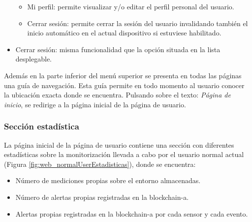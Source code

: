 \documentclass[12pt,a4paper, twoside]{report}
\begin{document}
\begin{itemize}
			\begin{itemize}
				\item Mi perfil: permite visualizar y/o editar el perfil personal del usuario.
				\item Cerrar sesión: permite cerrar la sesión del usuario invalidando también el inicio automático en el actual dispositivo si estuviese habilitado.
			\end{itemize}
			
		\item Cerrar sesión: misma funcionalidad que la opción situada en la lista desplegable.

	\end{itemize}

	Además en la parte inferior del menú superior se presenta en todas las páginas una guía de navegación. Esta guía permite en todo momento al usuario conocer la ubicación exacta donde se encuentra. Pulsando sobre el texto: \textit{Página de inicio}, se redirige a la página inicial de la página de usuario.
	
	\subsubsection{Sección estadística}
	
	La página inicial de la página de usuario contiene una sección con diferentes estadísticas sobre la monitorización llevada a cabo por el usuario normal actual (Figura \ref{fig:web_normalUserEstadisticas}), donde se encuentra:
	
	\begin{itemize}
		\item Número de mediciones propias sobre el entorno almacenadas.
		\item Número de alertas propias registradas en la \gls{blockchain-a}.
		\item Alertas propias registradas en la \gls{blockchain-a} por cada sensor y cada evento.
	\end{itemize}
	
\end{document}

